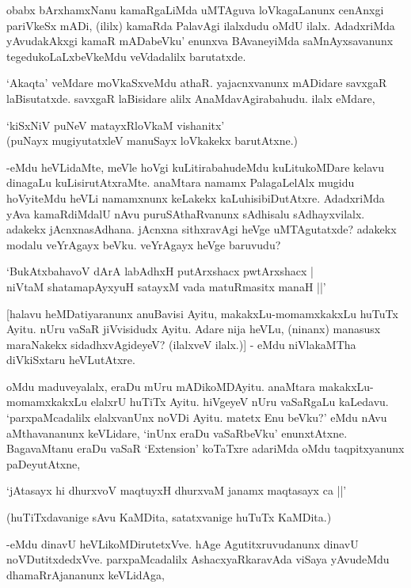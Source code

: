 obabx bArxhamxNanu kamaRgaLiMda uMTAguva loVkagaLanunx cenAnxgi pariVkeSx mADi, (ililx) kamaRda PalavAgi ilalxdudu oMdU ilalx. AdadxriMda yAvudakAkxgi kamaR mADabeVku' enunxva BAvaneyiMda saMnAyxsavanunx tegedukoLaLxbeVkeMdu veVdadalilx barutatxde.

`Akaqta' veMdare moVkaSxveMdu athaR. yajacnxvanunx mADidare savxgaR laBisutatxde. savxgaR laBisidare alilx AnaMdavAgirabahudu. ilalx eMdare,

\begin{shloka}
`kiSxNiV puNeV matayxRloVkaM vishanitx'\\
(puNayx mugiyutatxleV manuSayx loVkakekx barutAtxne.)
\end{shloka}

-eMdu heVLidaMte, meVle hoVgi kuLitirabahudeMdu kuLitukoMDare kelavu dinagaLu kuLisirutAtxraMte. anaMtara namamx PalagaLelAlx mugidu hoVyiteMdu heVLi namamxnunx keLakekx kaLuhisibiDutAtxre. AdadxriMda yAva kamaRdiMdalU nAvu puruSAthaRvanunx sAdhisalu sAdhayxvilalx. adakekx jAcnxnasAdhana. jAcnxna sithxravAgi heVge uMTAgutatxde? adakekx modalu veYrAgayx beVku. veYrAgayx heVge baruvudu?

\begin{shloka}
`BukAtxbahavoV dArA labAdhxH putArxshacx pwtArxshacx |\\
niVtaM shatamapAyxyuH satayxM vada matuRmasitx manaH ||'
\end{shloka}

[halavu heMDatiyaranunx anuBavisi Ayitu, makakxLu-momamxkakxLu huTuTx Ayitu. nUru vaSaR jiVvisidudx Ayitu. Adare nija heVLu, (ninanx) manasusx maraNakekx sidadhxvAgideyeV? (ilalxveV ilalx.)] - eMdu niVlakaMTha diVkiSxtaru heVLutAtxre.

oMdu maduveyalalx, eraDu mUru mADikoMDAyitu. anaMtara makakxLu-momamxkakxLu elalxrU huTiTx Ayitu. hiVgeyeV nUru vaSaRgaLu kaLedavu. `parxpaMcadalilx elalxvanUnx noVDi Ayitu. matetx Enu beVku?' eMdu nAvu aMthavananunx keVLidare, `inUnx eraDu vaSaRbeVku' enunxtAtxne. BagavaMtanu eraDu vaSaR `{\eng Extension}' koTaTxre adariMda oMdu taqpitxyanunx paDeyutAtxne,

\begin{shloka}
`jAtasayx hi dhurxvoV maqtuyxH dhurxvaM janamx maqtasayx ca ||'
\end{shloka}

(huTiTxdavanige sAvu KaMDita, satatxvanige huTuTx KaMDita.)

-eMdu dinavU heVLikoMDirutetxVve. hAge Agutitxruvudanunx dinavU noVDutitxdedxVve. parxpaMcadalilx AshacxyaRkaravAda viSaya yAvudeMdu dhamaRrAjananunx keVLidAga,

